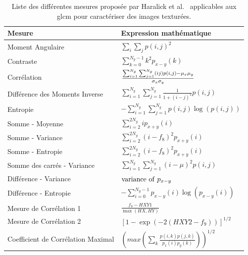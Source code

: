 \begin{table}[H]
    \centering
    \begin{tabular}{ll}
        \toprule
        \textbf{Mesure}                     & \textbf{Expression mathématique}                                                              \\ \hline
        Moment Angulaire                    & $ \sum_i\sum_jp(i,j)^2$                                                                       \\
        Contraste                           & $\sum_{k=0}^{N_g-1} k^2 p_{x-y}(k)$                                                           \\
        Corrélation                         & $\frac{\Large{\sum_{i=1}^{N_g}\sum_{j=1}^{N_g}} (ij)p(i,j) - \mu_x\mu_y}{\sigma_x\sigma_y}$   \\
        Différence des Moments Inverse      & $\sum_{i=1}^{N_g}\sum_{j=1}^{N_g} \frac{1}{1 + (i - j)^2} p(i,j)$                             \\   
        Entropie                            & $-\sum_{i=1}^{N_g}\sum_{j=1}^{N_g} p(i,j) \log(p(i,j))$                                       \\   
        Somme - Moyenne                     & $\sum_{i=2}^{2N_g} i p_{x+y}(i)$                                                              \\    
        Somme - Variance                    & $\sum_{i=2}^{2N_g} (i - f_8)^2 p_{x+y}(i)$                                                    \\    
        Somme - Entropie                    & $\sum_{i=2}^{2N_g} (i - f_8)^2 p_{x+y}(i)$                                                    \\    
        Somme des carrés - Variance         & $\sum_{i=1}^{N_g}\sum_{j=1}^{N_g} (i - \mu)^2 p(i,j)$                                         \\   
        Différence - Variance               & ${\rm variance \ of ~} p_{x-y}$                                                               \\    
        Différence - Entropie               & $-\sum_{i=0}^{N_g-1} p_{x-y}(i) \log(p_{x-y}(i))$                                             \\
        Mesure de Corrélation 1             & $\frac{f_9 - HXY1}{\max(HX,HY)}$                                                              \\  
        Mesure de Corrélation 2             & $[1 - \exp(-2(HXY2 - f_9))]^{1/2}$                                                            \\ 
        Coefficient de Corrélation Maximal  & $(max(\sum_k \frac{p(i,k)p(j,k)}{p_x(i)p_y(k)}))^{1/2}$                                       \\ 
        \bottomrule
    \end{tabular}
    \caption{Liste des différentes mesures proposée par Haralick et al.~\cite{Haralick1973} applicables aux \gls{glcm} pour caractériser des images texturées.}
    \label{tab:haralick_descriptors}
\end{table}\par
 
